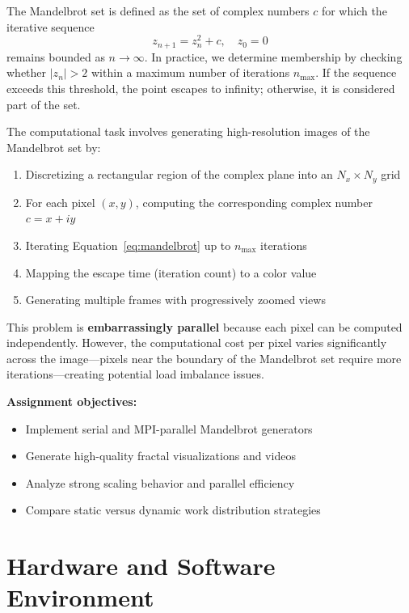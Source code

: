 \documentclass[11pt,a4paper]{article}
\begin{document}
	The Mandelbrot set is defined as the set of complex numbers $c$ for which the iterative sequence
	\begin{equation}\label{eq:mandelbrot}
		z_{n+1} = z_n^2 + c, \quad z_0 = 0
	\end{equation}
	remains bounded as $n \to \infty$. In practice, we determine membership by checking whether $|z_n| > 2$ within a maximum number of iterations $n_{\text{max}}$. If the sequence exceeds this threshold, the point escapes to infinity; otherwise, it is considered part of the set.
	
	The computational task involves generating high-resolution images of the Mandelbrot set by:
	\begin{enumerate}
		\item Discretizing a rectangular region of the complex plane into an $N_x \times N_y$ grid
		\item For each pixel $(x,y)$, computing the corresponding complex number $c = x + iy$
		\item Iterating Equation~\ref{eq:mandelbrot} up to $n_{\text{max}}$ iterations
		\item Mapping the escape time (iteration count) to a color value
		\item Generating multiple frames with progressively zoomed views
	\end{enumerate}
	
	This problem is \textbf{embarrassingly parallel} because each pixel can be computed independently. However, the computational cost per pixel varies significantly across the image—pixels near the boundary of the Mandelbrot set require more iterations—creating potential load imbalance issues.
	
	\textbf{Assignment objectives:}
	\begin{itemize}
		\item Implement serial and MPI-parallel Mandelbrot generators
		\item Generate high-quality fractal visualizations and videos
		\item Analyze strong scaling behavior and parallel efficiency
		\item Compare static versus dynamic work distribution strategies
	\end{itemize}
	
	\section{Hardware and Software Environment}
	
\end{document}
